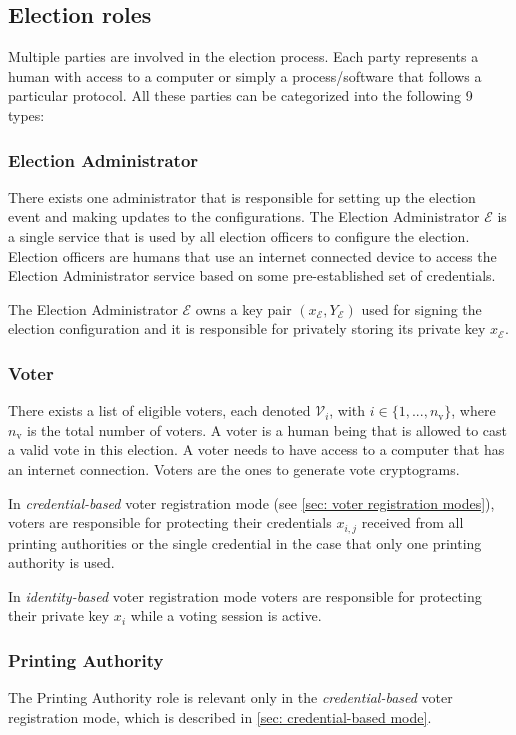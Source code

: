 \subsection{Election roles} \label{sec: election roles}
Multiple parties are involved in the election process. Each party represents a human with access to a computer or simply a process/software that follows a particular protocol. All these parties can be categorized into the following 9 types: 


\subsubsection{Election Administrator}
There exists one administrator that is responsible for setting up the election event and making updates to the configurations. The Election Administrator $\mathcal{E}$ is a single service that is used by all election officers to configure the election. Election officers are humans that use an internet connected device to access the Election Administrator service based on some pre-established set of credentials.

The Election Administrator $\mathcal{E}$ owns a key pair $(x_\mathcal{E}, Y_\mathcal{E})$ used for signing the election configuration and it is responsible for privately storing its private key $x_\mathcal{E}$.


\subsubsection{Voter}
There exists a list of eligible voters, each denoted $\mathcal{V}_i$, with \( i \in \{ 1, ..., n_\mathrm{v} \} \), where $n_\mathrm{v}$ is the total number of voters.  A voter is a human being that is allowed to cast a valid vote in this election. A voter needs to have access to a computer that has an internet connection. Voters are the ones to generate vote cryptograms.

In \textit{credential-based} voter registration mode (see \cref{sec: voter registration modes}), voters are responsible for protecting their credentials $x_{i,j}$ received from all printing authorities or the single credential in the case that only one printing authority is used.

In \textit{identity-based} voter registration mode voters are responsible for protecting their private key $x_i$ while a voting session is active.


\subsubsection{Printing Authority}
The Printing Authority role is relevant only in the \textit{credential-based} voter registration mode, which is described in \cref{sec: credential-based mode}.
    
